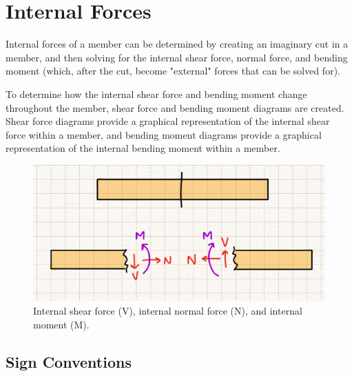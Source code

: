 \section{Internal Forces}

Internal forces of a member can be determined by creating an imaginary cut in a member, and then solving for the internal shear force, normal force, and bending moment (which, after the cut, become "external" forces that can be solved for). 

To determine how the internal shear force and bending moment change throughout the member, shear force and bending moment diagrams are created. Shear force diagrams provide a graphical representation of the internal shear force within a member, and bending moment diagrams provide a graphical representation of the internal bending moment within a member. 

\begin{figure}[!h]
\centering
\includegraphics[angle=0, width=5 in]{IntForceFigures/IntForces.jpg}
\vspace{-2mm}
\caption{\small Internal shear force (V), internal normal force (N), and internal moment (M).}
\vspace{-3mm}
\label{Fig:IntForces}
\end{figure}


\subsection{Sign Conventions}

